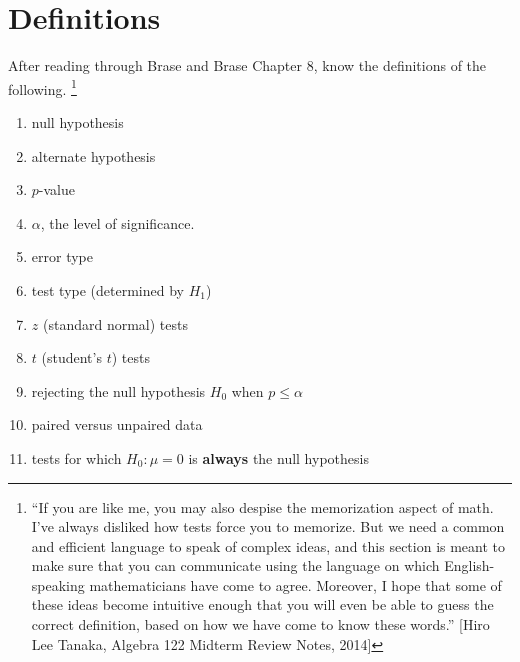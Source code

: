\documentclass{ccg-topic}
\author{Joseph Timmer (Edited by Colton Grainger)}
\date{\today}
\begin{document}
\frontstuff

\setcounter{section}{-1}

\section{Definitions}
After reading through Brase and Brase Chapter 8, know the definitions of the following.%
    \footnote{%
``If you are like me,  you may also despise the memorization aspect of math.  I've always disliked how tests force you to memorize.  But we need a common and efficient language to speak of complex ideas, and this section is meant to make sure that you can communicate using the language on which English-speaking mathematicians have come to agree.  Moreover, I hope that some of these ideas become intuitive enough that you will even be able to guess the correct definition, based on how we have come to know these words.'' [Hiro Lee Tanaka, Algebra 122 Midterm Review Notes, 2014]
    }

    \begin{enumerate}
    
        \item null hypothesis
        
        \item alternate hypothesis
        
        \item $p$-value 

        \item $\alpha$, the level of significance.
        
        \item error type
        
        \item test type (determined by $H_1$)
        
        \item $z$ (standard normal) tests

        \item $t$ (student's $t$) tests

        \item rejecting the null hypothesis $H_0$ when $p \le \alpha$
            
        \item paired versus unpaired data

        \item tests for which $H_0: \mu = 0$ is \textbf{always} the null hypothesis
            
    \end{enumerate}
\end{document}
